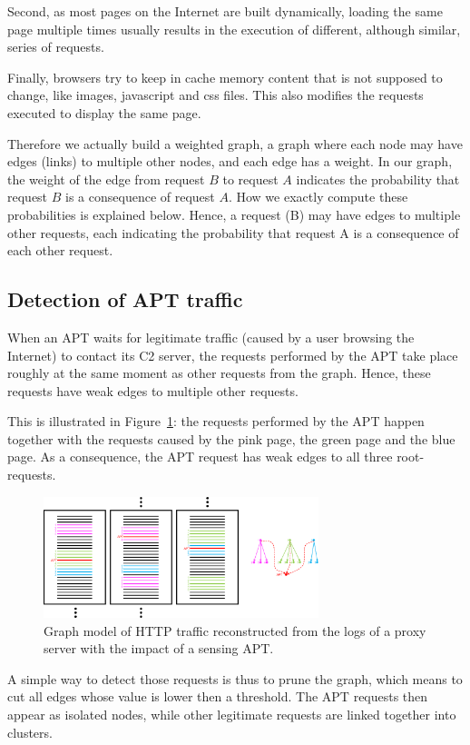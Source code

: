 \documentclass[conference]{IEEEtran}
\begin{document}
Second, as most pages on the Internet are built dynamically, loading the same page multiple times usually results in the execution of different, although similar, series of requests.

Finally, browsers try to keep in cache memory content that is not supposed to change, like images, javascript and css files. This also modifies the requests executed to display the same page.

Therefore we actually build a weighted graph, a graph where each node may have edges (links) to multiple other nodes, and each edge has a weight. In our graph, the weight of the edge from request $B$ to request $A$ indicates the probability that request $B$ is a consequence of request $A$. How we exactly compute these probabilities is explained below. Hence, a request (B) may have edges to multiple other requests, each indicating the probability that request A is a consequence of each other request.

\subsection{Detection of APT traffic}

When an APT waits for legitimate traffic (caused by a user browsing the Internet) to contact its C2 server, the requests performed by the APT take place roughly at the same moment as other requests from the graph. Hence, these requests have weak edges to multiple other requests.

This is illustrated in Figure~\ref{fig:tree-apt}: the requests performed by the APT happen together with the requests caused by the pink page, the green page and the blue page. As a consequence, the APT request has weak edges to all three root-requests.

\begin{figure}
  \centering
  \includegraphics[height=100pt]{tree-apt.eps}
  \caption{Graph model of HTTP traffic reconstructed from the logs of a proxy server with the impact of a sensing APT.}
  \label{fig:tree-apt}
\end{figure}

A simple way to detect those requests is thus to prune the graph, which means to cut all edges whose value is lower then a threshold. The APT requests then appear as isolated nodes, while other legitimate requests are linked together into clusters.
\end{document}
